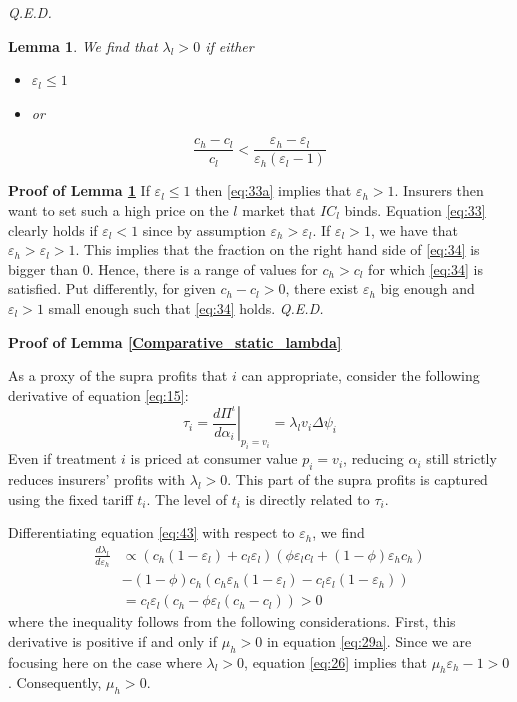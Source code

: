\documentclass[a4paper,12pt]{article}
\newtheorem{lemma}{Lemma}
\newcommand{\qed}{\hspace*{\fill} {\em Q.E.D.}}
\begin{document}
 \qed

\begin{lemma}
\label{IC_l_binding}
We find that \(\lambda_l >0\) if either
\begin{itemize}
\item \(\varepsilon_l \leq 1\)
\item or
\end{itemize}
\begin{equation}
\label{eq:34}
\frac{c_h-c_l}{c_l} < \frac{\varepsilon_h - \varepsilon_l}{\varepsilon_h (\varepsilon_l -1)}
\end{equation}
\end{lemma}

\textbf{Proof of Lemma \ref{IC_l_binding}}
If \(\varepsilon_l \leq 1\) then \eqref{eq:33a} implies that \(\varepsilon_h > 1\). Insurers then want to set such a high price on the \(l\) market that \(IC_l\) binds. Equation \eqref{eq:33} clearly holds if \(\varepsilon_l < 1\) since by assumption \(\varepsilon_h > \varepsilon_l\). If \(\varepsilon_l > 1\), we have that \(\varepsilon_h > \varepsilon_l>1\). This implies that the fraction on the right hand side of \eqref{eq:34} is bigger than 0. Hence, there is a range of values for \(c_h>c_l\) for which \eqref{eq:34} is satisfied. Put differently, for given \(c_h-c_l>0\), there exist \(\varepsilon_h\) big enough and \(\varepsilon_l>1\) small enough such that \eqref{eq:34} holds. 
 \qed

\textbf{Proof of Lemma \ref{Comparative_static_lambda}}

As a proxy of the supra profits that \(i\) can appropriate, consider the following derivative of equation \eqref{eq:15}:
\begin{equation}
\label{eq:1}
\tau_i = \left. \frac{d\Pi^{\iota}}{d\alpha_{i}} \right|_{p_i=v_i} = \lambda_l v_i \Delta \psi_i
\end{equation}
Even if treatment \(i\) is priced at consumer value \(p_i = v_i\), reducing \(\alpha_i\) still strictly reduces insurers' profits with \(\lambda_l > 0\). This part of the supra profits is captured using the fixed tariff \(t_i\). The level of \(t_i\) is directly related to \(\tau_i\).

Differentiating equation \eqref{eq:43} with respect to \(\varepsilon_h\), we find
\begin{align*}
\frac{d \lambda_l}{d \varepsilon_h} &\propto (c_h (1-\varepsilon_l)+c_l \varepsilon_l) (\phi \varepsilon_l c_l + (1-\phi) \varepsilon_hc_h)\\
  & - (1-\phi) c_h (c_h \varepsilon_h (1-\varepsilon_l) - c_l \varepsilon_l(1-\varepsilon_h)) \\
 &= c_l \varepsilon_l (c_h - \phi \varepsilon_l (c_h-c_l)) > 0
\end{align*}
where the inequality follows from the following considerations. First, this derivative is positive if and only if \(\mu_h >0\) in equation \eqref{eq:29a}. Since we are focusing here on the case where \(\lambda_l >0\), equation \eqref{eq:26} implies that \(\mu_h \varepsilon_h - 1>0\). Consequently, \(\mu_h >0\).
\end{document}

